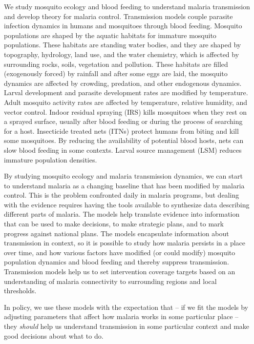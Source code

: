 \documentclass[
]{book}
\begin{document}
We study mosquito ecology and blood feeding to understand malaria transmission and develop theory for malaria control. Transmission models couple parasite infection dynamics in humans and mosquitoes through blood feeding. Mosquito populations are shaped by the aquatic habitats for immature mosquito populations. These habitats are standing water bodies, and they are shaped by topography, hydrology, land use, and the water chemistry, which is affected by surrounding rocks, soils, vegetation and pollution. These habitats are filled (exogenously forced) by rainfall and after some eggs are laid, the mosquito dynamics are affected by crowding, predation, and other endogenous dynamics. Larval development and parasite development rates are modified by temperature. Adult mosquito activity rates are affected by temperature, relative humidity, and vector control. Indoor residual spraying (IRS) kills mosquitoes when they rest on a sprayed surface, usually after blood feeding or during the process of searching for a host. Insecticide treated nets (ITNs) protect humans from biting and kill some mosquitoes. By reducing the availability of potential blood hosts, nets can slow blood feeding in some contexts. Larval source management (LSM) reduces immature population densities.

By studying mosquito ecology and malaria transmission dynamics, we can start to understand malaria as a changing baseline that has been modified by malaria control. This is the problem confronted daily in malaria programs, but dealing with the evidence requires having the tools available to synthesize data describing different parts of malaria. The models help translate evidence into information that can be used to make decisions, to make strategic plans, and to mark progress against national plans. The models encapsulate information about transmission in context, so it is possible to study how malaria persists in a place over time, and how various factors have modified (or could modify) mosquito population dynamics and blood feeding and thereby suppress transmission. Transmission models help us to set intervention coverage targets based on an understanding of malaria connectivity to surrounding regions and local thresholds.

In policy, we use these models with the expectation that -- if we fit the models by adjusting parameters that affect how malaria works in some particular place -- they \emph{should} help us understand transmission in some particular context and make good decisions about what to do.
\end{document}
